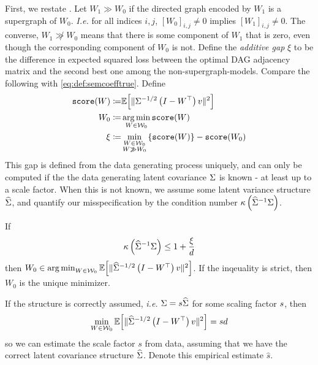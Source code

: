 First, we restate \citet[Theorem 9]{loh_high-dimensional_2014}. 
Let $W_1 \gg W_0$ if the directed graph encoded by $W_1$ is a supergraph of $W_0$. \emph{I.e.} for all indices $i,j$, $[W_0]_{i,j} \neq 0$ implies $[W_1]_{i,j} \neq 0$. The converse, $W_1 \not\gg W_0$ means that there is some component of $W_1$ that is zero, even though the corresponding  component of $W_0$ is not. 
Define the \emph{additive gap} $\xi $ to be the difference in expected squared loss between the optimal DAG adjacency matrix and the second best one among the non-supergraph-models. Compare the following with \eqref{eq:def:semcoefftrue}. Define
\begin{align}
\mathtt{score}(W)\coloneqq& \mathbb{E}\Big[ \lVert\Sigma^{-1/2}  \left(I - W^\top\right)v \rVert^2 \Big] \\
W_{0} \coloneqq& \operatorname*{arg\,min}_{W \in \mathcal W_0} \mathtt{score}(W) \\
\xi \coloneqq& \min_{\substack{W \in \mathcal W_0\\ W\not\gg W_0 }} \left\{ \mathtt{score}(W)\right\} - \mathtt{score}(W_0) 
\end{align}
This gap is defined from the data generating process uniquely, and can only be computed if the the data generating latent covariance $ \Sigma$ is known - at least up to a scale factor. 
When this is not known, we assume some latent variance structure $\widehat {\Sigma}$, and quantify our misspecification by the condition number $\kappa\left(\widehat{\Sigma}^{-1}\Sigma\right)$.

\begin{lemma}
If
\[\kappa\left(\widehat{\Sigma}^{-1}\Sigma\right) \leq 1+\frac{\xi}{d} \label{eq:good noise covariance}\]
then $W_0 \in\operatorname*{arg\,min}_{W \in \mathcal W_0} \mathbb{E}\Big[ \lVert\widehat{\Sigma}^{-1/2}  \left(I - W^\top\right)v \rVert^2 \Big]$. If the inqeuality is strict, then $W_0$ is the unique minimizer.
\end{lemma}

If the structure is correctly assumed, \emph{i.e.} $\Sigma = s \widehat{\Sigma}$ for some scaling factor $s$, then 
\[ \min_{W \in \mathcal W_0} \mathbb{E}\Big[ \lVert\widehat{\Sigma}^{-1/2}  \left(I - W^\top\right)v \rVert^2 \Big] = sd\]
so we can estimate the scale factor $s$ from data, assuming that we have the correct latent covariance structure $\widehat {\Sigma}$.\citep[Corollary 8]{loh_high-dimensional_2014} Denote this empirical estimate $\hat s$.

